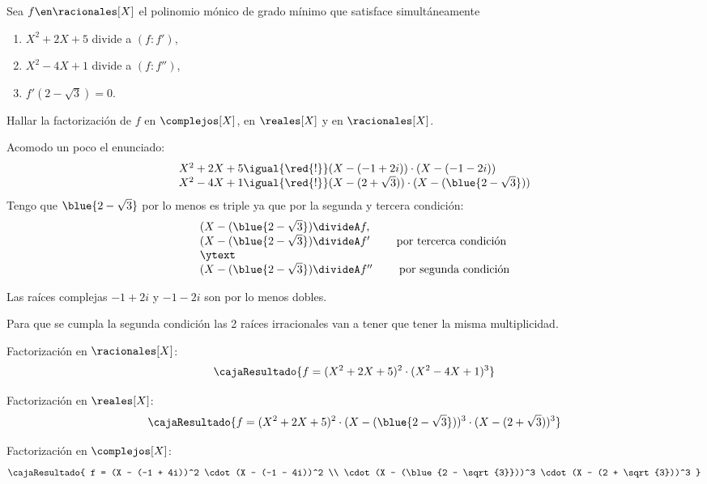 \begin{enunciado}{\ejExtra}
  Sea $f \en \racionales[X]$ el polinomio mónico de grado mínimo que satisface simultáneamente
  \begin{enumerate}[label={\tiny $\blacksquare$}]
    \item $X^2 + 2X + 5$ divide a $(f:f')$,
    \item $X^2 - 4X + 1$ divide a $(f:f'')$,
    \item $f'(2-\sqrt{3}) = 0$.
  \end{enumerate}
  Hallar la factorización de $f$ en $\complejos[X]$, en $\reales[X]$ y en $\racionales[X]$.
\end{enunciado}

Acomodo un poco el enunciado:
$$
  \begin{array}{l}
    X^2 + 2X + 5
    \igual{\red{!}}
    (X - (-1 + 2i)) \cdot (X - (-1 - 2i))                  \\
    X^2 -4 X + 1
    \igual{\red{!}}
    (X - (2 + \sqrt{3})) \cdot (X - (\blue{2 - \sqrt{3}})) \\
  \end{array}
$$
Tengo que $\blue{2 - \sqrt{3}}$ por lo menos es triple ya que por la segunda y tercera condición:
$$
  \begin{array}{l}
    (X - (\blue{2 - \sqrt{3}}) \divideA f                                        , \\
    (X - (\blue{2 - \sqrt{3}}) \divideA f' \qquad \text{ por tercerca condición}   \\
    \ytext                                                                         \\
    (X - (\blue{2 - \sqrt{3}}) \divideA f'' \qquad \text{ por segunda condición}   \\
  \end{array}
$$

Las raíces complejas $-1 + 2i$ y $-1 - 2i$ son por lo menos dobles.

\bigskip

Para que se cumpla la segunda condición las 2 raíces irracionales van a tener que tener la misma multiplicidad.

\medskip

Factorización en $\racionales[X]$:
$$
  \cajaResultado{
    f =
    (X^2 + 2X + 5)^2
    \cdot
    (X^2 - 4X + 1)^3
  }
$$

Factorización en $\reales[X]$:
$$
  \cajaResultado{
    f =
    (X^2 + 2X + 5)^2
    \cdot
    (X - (\blue{2 - \sqrt{3}}))^3
    \cdot
    (X - (2 + \sqrt{3}))^3
  }
$$

Factorización en $\complejos[X]$:
$$
  \cajaResultado{
    f =
    (X - (-1 + 4i))^2 \cdot (X - (-1 - 4i))^2                  \\
    \cdot
    (X - (\blue{2 - \sqrt{3}}))^3
    \cdot
    (X - (2 + \sqrt{3}))^3
  }
$$
\begin{aportes}
  \item {}
  \item {}
\end{aportes}
